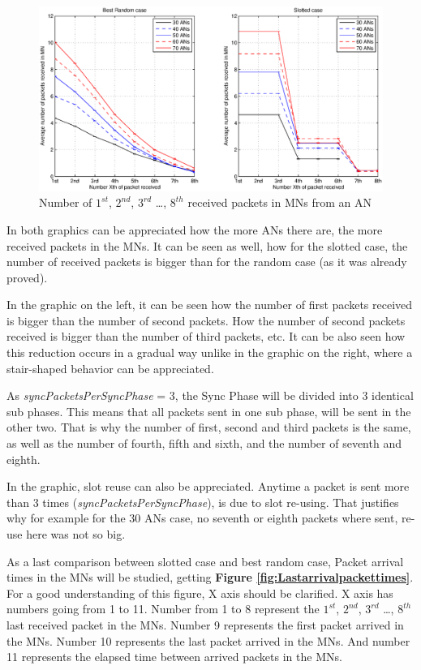 \begin{figure}[ht]
 \begin{center}
  \includegraphics[width=1\textwidth]{numberOf1st2ndPacketsReceived.eps}
 \end{center}
 \caption{Number of $1^{st}$, $2^{nd}$, $3^{rd}$ \ldots, $8^{th}$ received packets in \acp{MN} from an \ac{AN}}
 \label{fig:numberOf1st2ndPacketsReceived}
\end{figure}

In both graphics can be appreciated how the more \acp{AN} there are, the more received packets in the \acp{MN}. It can be seen as well, how
for the slotted case, the number of received packets is bigger than for the random case (as it was already proved).

In the graphic on the left, it can be seen how the number of first packets received is bigger than the number of second packets. How the number of 
second packets received is bigger than the number of third packets, etc. It can be also seen how this reduction occurs in a gradual way unlike 
in the graphic on the right, where a stair-shaped behavior can be appreciated.

As \textit{syncPacketsPerSyncPhase} = 3, the Sync Phase will be divided into 3 identical sub phases. This means that all packets sent in one sub 
phase, will be sent in the other two. That is why the number of first, second and third packets is the same, as well as the number of fourth, fifth 
and sixth, and the number of seventh and eighth.

In the graphic, slot reuse can also be appreciated. Anytime a packet is sent more than 3 times (\textit{syncPacketsPerSyncPhase}), is due to slot re-using. 
That justifies why for example for the 30 \acp{AN} case, no seventh or eighth packets where sent, re-use here was not so big.

As a last comparison between slotted case and best random case, Packet arrival times in the \acp{MN} will be studied, getting \textbf{Figure
\ref{fig:Lastarrivalpackettimes}}. For a good understanding of this figure, X axis should be clarified. X axis has numbers
going from 1 to 11. Number from 1 to 8 represent the $1^{st}$, $2^{nd}$, $3^{rd}$ \ldots, $8^{th}$ last received packet in the \acp{MN}. Number 9 
represents the first packet arrived in the \acp{MN}. Number 10 represents the last packet arrived in the \acp{MN}. And number 11 represents the elapsed 
time between arrived packets in the \acp{MN}.

